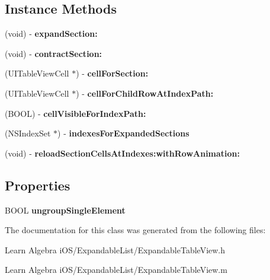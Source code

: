 \subsection*{Instance Methods}
\begin{DoxyCompactItemize}
\item 
\hypertarget{interface_expandable_table_view_ac6c101f267a84fb7b0933f5cd1fa3bb7}{(void) -\/ {\bfseries expand\-Section\-:}}\label{interface_expandable_table_view_ac6c101f267a84fb7b0933f5cd1fa3bb7}

\item 
\hypertarget{interface_expandable_table_view_a3d987355e5e049b9d4d4609bce7556ab}{(void) -\/ {\bfseries contract\-Section\-:}}\label{interface_expandable_table_view_a3d987355e5e049b9d4d4609bce7556ab}

\item 
\hypertarget{interface_expandable_table_view_ae613db3e2984829174f035a381dc9ada}{(U\-I\-Table\-View\-Cell $\ast$) -\/ {\bfseries cell\-For\-Section\-:}}\label{interface_expandable_table_view_ae613db3e2984829174f035a381dc9ada}

\item 
\hypertarget{interface_expandable_table_view_a13f8d1851b047f39230e540deae43655}{(U\-I\-Table\-View\-Cell $\ast$) -\/ {\bfseries cell\-For\-Child\-Row\-At\-Index\-Path\-:}}\label{interface_expandable_table_view_a13f8d1851b047f39230e540deae43655}

\item 
\hypertarget{interface_expandable_table_view_ab627357a8837aa34c901063cba74514b}{(B\-O\-O\-L) -\/ {\bfseries cell\-Visible\-For\-Index\-Path\-:}}\label{interface_expandable_table_view_ab627357a8837aa34c901063cba74514b}

\item 
\hypertarget{interface_expandable_table_view_a4df26c9e3df8cb201132f967ced513d1}{(N\-S\-Index\-Set $\ast$) -\/ {\bfseries indexes\-For\-Expanded\-Sections}}\label{interface_expandable_table_view_a4df26c9e3df8cb201132f967ced513d1}

\item 
\hypertarget{interface_expandable_table_view_ae866900ff8451886c722b4da280021ed}{(void) -\/ {\bfseries reload\-Section\-Cells\-At\-Indexes\-:with\-Row\-Animation\-:}}\label{interface_expandable_table_view_ae866900ff8451886c722b4da280021ed}

\end{DoxyCompactItemize}
\subsection*{Properties}
\begin{DoxyCompactItemize}
\item 
\hypertarget{interface_expandable_table_view_a0bfa089eed072ad338eae9911e6ff587}{B\-O\-O\-L {\bfseries ungroup\-Single\-Element}}\label{interface_expandable_table_view_a0bfa089eed072ad338eae9911e6ff587}

\end{DoxyCompactItemize}


The documentation for this class was generated from the following files\-:\begin{DoxyCompactItemize}
\item 
Learn Algebra i\-O\-S/\-Expandable\-List/Expandable\-Table\-View.\-h\item 
Learn Algebra i\-O\-S/\-Expandable\-List/Expandable\-Table\-View.\-m\end{DoxyCompactItemize}

